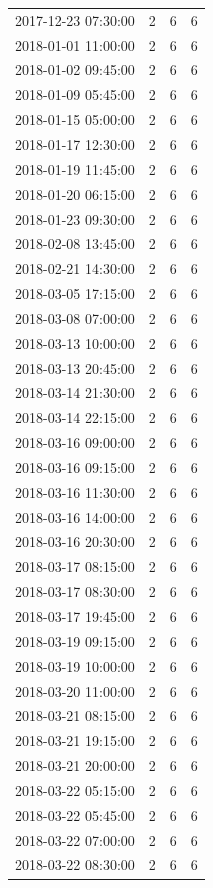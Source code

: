 \begin{tabular}{lrrr}
2017-12-23 07:30:00 & 2 & 6 & 6 \\
2018-01-01 11:00:00 & 2 & 6 & 6 \\
2018-01-02 09:45:00 & 2 & 6 & 6 \\
2018-01-09 05:45:00 & 2 & 6 & 6 \\
2018-01-15 05:00:00 & 2 & 6 & 6 \\
2018-01-17 12:30:00 & 2 & 6 & 6 \\
2018-01-19 11:45:00 & 2 & 6 & 6 \\
2018-01-20 06:15:00 & 2 & 6 & 6 \\
2018-01-23 09:30:00 & 2 & 6 & 6 \\
2018-02-08 13:45:00 & 2 & 6 & 6 \\
2018-02-21 14:30:00 & 2 & 6 & 6 \\
2018-03-05 17:15:00 & 2 & 6 & 6 \\
2018-03-08 07:00:00 & 2 & 6 & 6 \\
2018-03-13 10:00:00 & 2 & 6 & 6 \\
2018-03-13 20:45:00 & 2 & 6 & 6 \\
2018-03-14 21:30:00 & 2 & 6 & 6 \\
2018-03-14 22:15:00 & 2 & 6 & 6 \\
2018-03-16 09:00:00 & 2 & 6 & 6 \\
2018-03-16 09:15:00 & 2 & 6 & 6 \\
2018-03-16 11:30:00 & 2 & 6 & 6 \\
2018-03-16 14:00:00 & 2 & 6 & 6 \\
2018-03-16 20:30:00 & 2 & 6 & 6 \\
2018-03-17 08:15:00 & 2 & 6 & 6 \\
2018-03-17 08:30:00 & 2 & 6 & 6 \\
2018-03-17 19:45:00 & 2 & 6 & 6 \\
2018-03-19 09:15:00 & 2 & 6 & 6 \\
2018-03-19 10:00:00 & 2 & 6 & 6 \\
2018-03-20 11:00:00 & 2 & 6 & 6 \\
2018-03-21 08:15:00 & 2 & 6 & 6 \\
2018-03-21 19:15:00 & 2 & 6 & 6 \\
2018-03-21 20:00:00 & 2 & 6 & 6 \\
2018-03-22 05:15:00 & 2 & 6 & 6 \\
2018-03-22 05:45:00 & 2 & 6 & 6 \\
2018-03-22 07:00:00 & 2 & 6 & 6 \\
2018-03-22 08:30:00 & 2 & 6 & 6 \\

\end{tabular}
